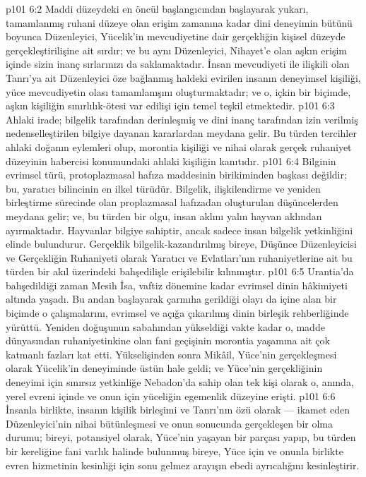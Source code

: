 \vs p101 6:2 Maddi düzeydeki en öncül başlangıcından başlayarak yukarı, tamamlanmış ruhani düzeye olan erişim zamanına kadar dini deneyimin bütünü boyunca Düzenleyici, Yücelik’in mevcudiyetine dair gerçekliğin kişisel düzeyde gerçekleştirilişine ait sırdır; ve bu aynı Düzenleyici, Nihayet’e olan aşkın erişim içinde sizin inanç sırlarınızı da saklamaktadır. İnsan mevcudiyeti ile ilişkili olan Tanrı’ya ait Düzenleyici öze bağlanmış haldeki evirilen insanın deneyimsel kişiliği, yüce mevcudiyetin olası tamamlanışını oluşturmaktadır; ve o, içkin bir biçimde, aşkın kişiliğin sınırlılık\hyp{}ötesi var edilişi için temel teşkil etmektedir.
\vs p101 6:3 Ahlaki irade; bilgelik tarafından derinleşmiş ve dini inanç tarafından izin verilmiş nedenselleştirilen bilgiye dayanan kararlardan meydana gelir. Bu türden tercihler ahlaki doğanın eylemleri olup, morontia kişiliği ve nihai olarak gerçek ruhaniyet düzeyinin habercisi konumundaki ahlaki kişiliğin kanıtıdır.
\vs p101 6:4 Bilginin evrimsel türü, protoplazmasal hafıza maddesinin birikiminden başkası değildir; bu, yaratıcı bilincinin en ilkel türüdür. Bilgelik, ilişkilendirme ve yeniden birleştirme sürecinde olan proplazmasal hafızadan oluşturulan düşüncelerden meydana gelir; ve, bu türden bir olgu, insan aklını yalın hayvan aklından ayırmaktadır. Hayvanlar bilgiye sahiptir, ancak sadece insan bilgelik yetkinliğini elinde bulundurur. Gerçeklik bilgelik\hyp{}kazandırılmış bireye, Düşünce Düzenleyicisi ve Gerçekliğin Ruhaniyeti olarak Yaratıcı ve Evlatları’nın ruhaniyetlerine ait bu türden bir akıl üzerindeki bahşedilişle erişilebilir kılınmıştır.
\vs p101 6:5 Urantia’da bahşedildiği zaman Mesih İsa, vaftiz dönemine kadar evrimsel dinin hâkimiyeti altında yaşadı. Bu andan başlayarak çarmıha gerildiği olayı da içine alan bir biçimde o çalışmalarını, evrimsel ve açığa çıkarılmış dinin birleşik rehberliğinde yürüttü. Yeniden doğuşunun sabahından yükseldiği vakte kadar o, madde dünyasından ruhaniyetinkine olan fani geçişinin morontia yaşamına ait çok katmanlı fazları kat etti. Yükselişinden sonra Mikâil, Yüce’nin gerçekleşmesi olarak Yücelik’in deneyiminde üstün hale geldi; ve Yüce’nin gerçekliğinin deneyimi için sınırsız yetkinliğe Nebadon’da sahip olan tek kişi olarak o, anında, yerel evreni içinde ve onun için yüceliğin egemenlik düzeyine erişti.
\vs p101 6:6 İnsanla birlikte, insanın kişilik birleşimi ve Tanrı’nın özü olarak --- ikamet eden Düzenleyici’nin nihai bütünleşmesi ve onun sonucunda gerçekleşen bir olma durumu; bireyi, potansiyel olarak, Yüce’nin yaşayan bir parçası yapıp, bu türden bir kereliğine fani varlık halinde bulunmuş bireye, Yüce için ve onunla birlikte evren hizmetinin kesinliği için sonu gelmez arayışın ebedi ayrıcalığını kesinleştirir.
